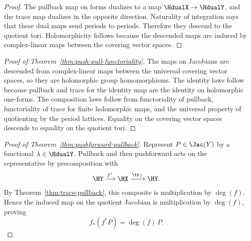\begin{proof}\leanok
The pullback map on forms dualizes to a map \(\HdualX\to\HdualY\), and the
trace map dualizes in the opposite direction. Naturality of integration says
that these dual maps send periods to periods. Therefore they descend to the
quotient tori. Holomorphicity follows because the descended maps are induced
by complex-linear maps between the covering vector spaces.
\end{proof}

\begin{proof}[Proof of Theorem~\ref{thm:push-pull-functoriality}]\leanok
The maps on Jacobians are descended from complex-linear maps between the
universal covering vector spaces, so they are holomorphic group homomorphisms.
The identity laws follow because pullback and trace for the identity map are
the identity on holomorphic one-forms. The composition laws follow from
functoriality of pullback, functoriality of trace for finite holomorphic maps,
and the universal property of quotienting by the period lattices. Equality on
the covering vector spaces descends to equality on the quotient tori.
\end{proof}

\begin{proof}[Proof of Theorem~\ref{thm:pushforward-pullback}]\leanok
Represent \(P\in\Jac(Y)\) by a functional \(\lambda\in\HdualY\). Pullback and
then pushforward acts on the representative by precomposition with
\[
  \HY \xrightarrow{f^{*}} \HX \xrightarrow{\tr_f} \HY .
\]
By Theorem~\ref{thm:trace-pullback}, this composite is multiplication by
\(\deg(f)\). Hence the induced map on the quotient Jacobian is multiplication
by \(\deg(f)\), proving
\[
  f_*(f^{*}P)=\deg(f)\,P.
\]
\end{proof}

